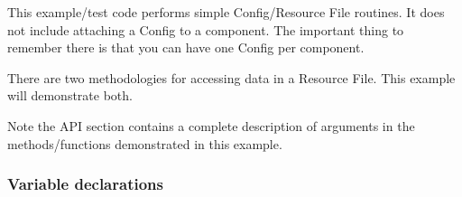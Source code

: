  
\setlength{\oldparskip}{\parskip}
\setlength{\parskip}{1.5ex}
\setlength{\oldparindent}{\parindent}
\setlength{\parindent}{0pt}
\setlength{\oldbaselineskip}{\baselineskip}
\setlength{\baselineskip}{11pt}
 
\def\bv{\begin{verbatim}}
\def\ev{\end{verbatim}}
\def\be{\begin{equation}}
\def\ee{\end{equation}}
\def\bea{\begin{eqnarray}}
\def\eea{\end{eqnarray}}
\def\bi{\begin{itemize}}
\def\ei{\end{itemize}}
\def\bn{\begin{enumerate}}
\def\en{\end{enumerate}}
\def\bd{\begin{description}}
\def\ed{\end{description}}
\def\({\left (}
\def\){\right )}
\def\[{\left [}
\def\]{\right ]}
\def\<{\left  \langle}
\def\>{\right \rangle}
\def\cI{{\cal I}}
\def\diag{\mathop{\rm diag}}
\def\tr{\mathop{\rm tr}}


 

   This example/test code performs simple Config/Resource File routines. It does not
   include attaching a Config to a component. The important thing to remember there
   is that you can have one Config per component. 
  
   There are two methodologies for accessing data in a Resource File.  This example will
   demonstrate both.
 
   Note the API section contains a complete description of arguments in
   the methods/functions demonstrated in this example. 

  \subsubsection{Variable declarations}
 
